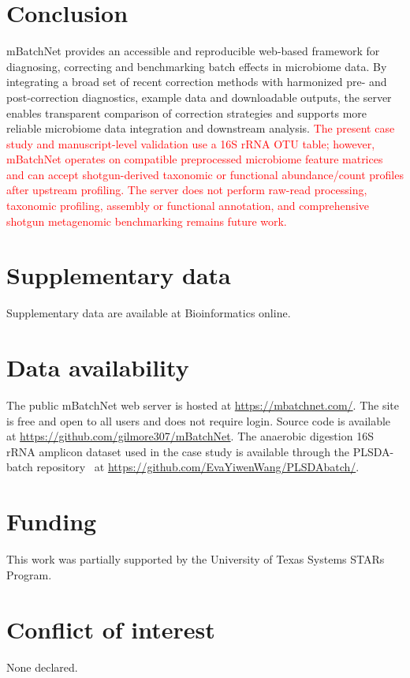 \documentclass[webpdf,contemporary,large,numbered]{oup-authoring-template}
\providecommand{\rev}[1]{\textcolor{red}{#1}}
\begin{document}
\section{Conclusion}
mBatchNet provides an accessible and reproducible web-based framework for diagnosing, correcting and benchmarking batch effects in microbiome data. By integrating a broad set of recent correction methods with harmonized pre- and post-correction diagnostics, example data and downloadable outputs, the server enables transparent comparison of correction strategies and supports more reliable microbiome data integration and downstream analysis. \rev{The present case study and manuscript-level validation use a 16S rRNA OTU table; however, mBatchNet operates on compatible preprocessed microbiome feature matrices and can accept shotgun-derived taxonomic or functional abundance/count profiles after upstream profiling. The server does not perform raw-read processing, taxonomic profiling, assembly or functional annotation, and comprehensive shotgun metagenomic benchmarking remains future work.}

\section*{Supplementary data}
Supplementary data are available at Bioinformatics online.

\section*{Data availability}
The public mBatchNet web server is hosted at \rev{\url{https://mbatchnet.com/}}. The site is free and open to all users and does not require login. Source code is available at \url{https://github.com/gilmore307/mBatchNet}. The anaerobic digestion 16S rRNA amplicon dataset used in the case study is available through the PLSDA-batch repository~\citep{Wang2023PLSDABatch} at \url{https://github.com/EvaYiwenWang/PLSDAbatch/}.


\section*{Funding}
This work was partially supported by the University of Texas Systems STARs Program.

\section*{Conflict of interest}
None declared.



\end{document}
